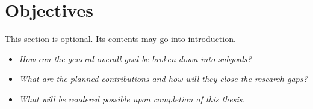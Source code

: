 \section{Objectives}
\label{sec:Objectives}

This section is optional. Its contents may go into introduction.

\begin{itemize}	
	\item \emph{How can the general overall goal be broken down into subgoals?}
	\item \emph{What are the planned contributions and how will they close the research gaps?}
	\item \emph{What will be rendered possible upon completion of this thesis.}
\end{itemize}